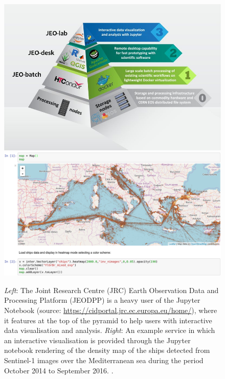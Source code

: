 \begin{figure}
  \centering\includegraphics[height=0.2\textheight]{images/jeodpp.png}
  \centering\includegraphics[height=0.2\textheight]{images/jeodpp-demo.jpg}
  \caption{\emph{Left}: The Joint Research Centre (JRC) Earth Observation
    Data and Processing Platform (JEODPP) is a heavy user of the
    Jupyter Notebook (source:
    \url{https://cidportal.jrc.ec.europa.eu/home/}), where it features
    at the top of the pyramid to help users with interactive data
    visualisation and analysis. \emph{Right}: An example
    service in which an interactive visualisation is provided through
    the Jupyter notebook rendering of the density map of the ships
    detected from Sentinel-1 images over the Mediterranean sea during
    the period October 2014 to September 2016. \cite[Figure
    6]{Soille2018}. \label{fig:jeodpp}}
\end{figure}

